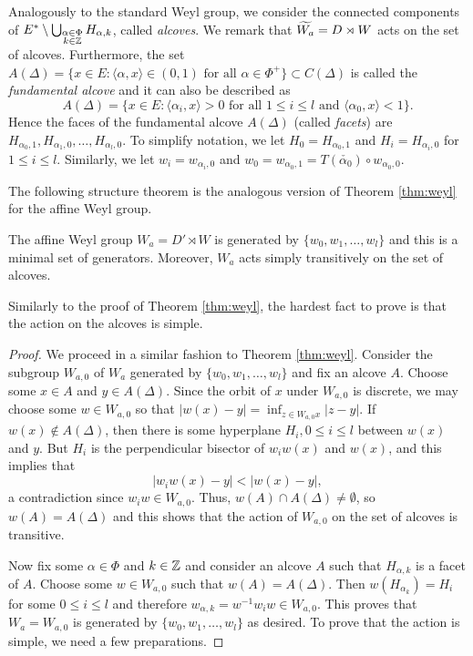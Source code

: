 Analogously to the standard Weyl group, we consider the connected components of $E^*\setminus\bigcup_{\substack{\alpha\in\Phi\\k\in\mathbb{Z}}}H_{\alpha,k}$, called \textit{alcoves}. We remark that $\widetilde{W_a}=D\rtimes W$ acts on the set of alcoves. Furthermore, the set $A(\Delta)=\{x\in E:\langle\alpha,x\rangle\in(0,1)\text{ for all }\alpha\in\Phi^+\}\subset C(\Delta)$ is called the \textit{fundamental alcove} and it can also be described as 
$$A(\Delta)=\{x\in E:\langle\alpha_i,x\rangle>0\text{ for all }1\leq i\leq l\text{ and }\langle\alpha_0,x\rangle<1\}.$$
Hence the faces of the fundamental alcove $A(\Delta)$ (called \textit{facets}) are $H_{\alpha_0,1},H_{\alpha_1,0},\ldots,H_{\alpha_l,0}$. To simplify notation, we let $H_0=H_{\alpha_0,1}$ and $H_i=H_{\alpha_i,0}$ for $1\leq i\leq l$. Similarly, we let $w_i=w_{\alpha_i,0}$ and $w_0=w_{\alpha_0,1}=T(\check{\alpha_0})\circ w_{\alpha_0,0}$.

The following structure theorem is the analogous version of Theorem \ref{thm:weyl} for the affine Weyl group.

\begin{theorem}\label{thm:affineweyl}
    The affine Weyl group $W_a=D'\rtimes W$ is generated by $\{w_0,w_1,\ldots,w_l\}$ and this is a minimal set of generators. Moreover, $W_a$ acts simply transitively on the set of alcoves.
\end{theorem}
Similarly to the proof of Theorem \ref{thm:weyl}, the hardest fact to prove is that the action on the alcoves is simple.

\begin{proof}
    We proceed in a similar fashion to Theorem \ref{thm:weyl}. Consider the subgroup $W_{a,0}$ of $W_a$ generated by $\{w_0,w_1,\ldots,w_l\}$ and fix an alcove $A$. Choose some $x\in A$ and $y\in A(\Delta)$. Since the orbit of $x$ under $W_{a,0}$ is discrete, we may choose some $w\in W_{a,0}$ so that 
    $|w(x)-y|=\inf_{z\in W_{a,0}x}|z-y|$. If $w(x)\not\in A(\Delta)$, then there is some hyperplane $H_i, 0\leq i\leq l$ between $w(x)$ and $y$. But $H_i$ is the perpendicular bisector of $w_iw(x)$ and $w(x)$, and this implies that
    $$|w_iw(x)-y|<|w(x)-y|,$$
    a contradiction since $w_iw\in W_{a,0}$. Thus, $w(A)\cap A(\Delta)\neq\emptyset$, so $w(A)=A(\Delta)$ and this shows that the action of $W_{a,0}$ on the set of alcoves is transitive.

    Now fix some $\alpha\in\Phi$ and $k\in\mathbb{Z}$ and consider an alcove $A$ such that $H_{\alpha,k}$ is a facet of $A$. Choose some $w\in W_{a,0}$ such that $w(A)=A(\Delta)$. Then $w(H_{\alpha_k})=H_i$ for some $0\leq i\leq l$ and therefore $w_{\alpha,k}=w^{-1}w_iw\in W_{a,0}$. This proves that $W_a=W_{a,0}$ is generated by $\{w_0,w_1,\ldots,w_l\}$ as desired. To prove that the action is simple, we need a few preparations.
\end{proof}

